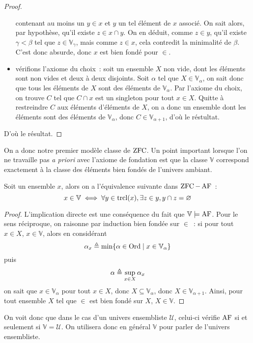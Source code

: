 \begin{proof}
\begin{itemize}
    contenant au moins un $y \in x$ et $y$ un tel élément de $x$ associé. On
    sait alors, par hypothèse, qu'il existe $z \in x \cap y$. On en déduit,
    comme $z \in y$, qu'il existe $\gamma < \beta$ tel que
    $z \in \mathbb V_\gamma$, mais comme $z \in x$, cela contredit la minimalité
    de $\beta$. C'est donc absurde, donc $x$ est bien fondé pour $\in$.
  \item vérifions l'axiome du choix~: soit un ensemble $X$ non vide, dont les
    éléments sont non vides et deux à deux disjoints. Soit $\alpha$ tel que
    $X \in \mathbb V_\alpha$, on sait donc que tous les éléments de $X$ sont
    des éléments de $\mathbb V_\alpha$. Par l'axiome du choix, on trouve
    $C$ tel que $C \cap x$ est un singleton pour tout $x \in X$. Quitte à
    restreindre $C$ aux éléments d'éléments de $X$, on a donc un ensemble
    dont les éléments sont des éléments de $\mathbb V_\alpha$, donc
    $C\in\mathbb V_{\alpha + 1}$, d'où le réstultat.
  \end{itemize}
  D'où le résultat.
\end{proof}

On a donc notre premier modèle classe de $\operatorname{ZFC}$. Un point important lorsque l'on
ne travaille pas \emph{a priori} avec l'axiome de fondation est que la classe
$\mathbb V$ correspond exactement à la classe des éléments bien fondés de
l'univers ambiant.

\begin{proposition}
  Soit un ensemble $x$, alors on a l'équivalence suivante dans $\operatorname{ZFC}-\operatorname{AF}$~:
  \[x\in \mathbb V \iff
  \forall y \in \operatorname{trcl}(x), \exists z \in y, y \cap z = \varnothing\]
\end{proposition}

\begin{proof}
  L'implication directe est une conséquence du fait que $\mathbb V\models \operatorname{AF}$.
  Pour le sens réciproque, on raisonne par induction bien fondée sur $\in$~:
  si pour tout $x \in X$, $x \in \mathbb V$, alors en considérant
  \[\alpha_x \triangleq \min\{\alpha \in \operatorname{Ord}\mid x \in \mathbb V_\alpha\}\]
  puis
  \[\alpha \triangleq \sup_{x \in X} \alpha_x\]
  on sait que $x\in \mathbb V_\alpha$ pour tout $x \in X$, donc
  $X\subseteq \mathbb V_\alpha$, donc $X \in \mathbb V_{\alpha + 1}$.
  Ainsi, pour tout ensemble $X$ tel que $\in$ est bien fondé sur $X$,
  $X \in \mathbb V$.
\end{proof}

On voit donc que dans le cas d'un univers ensembliste $\mathcal U$, celui-ci
vérifie $\operatorname{AF}$ si et seulement si $\mathbb V = \mathcal U$. On utilisera donc en
général $\mathbb V$ pour parler de l'univers ensembliste.

